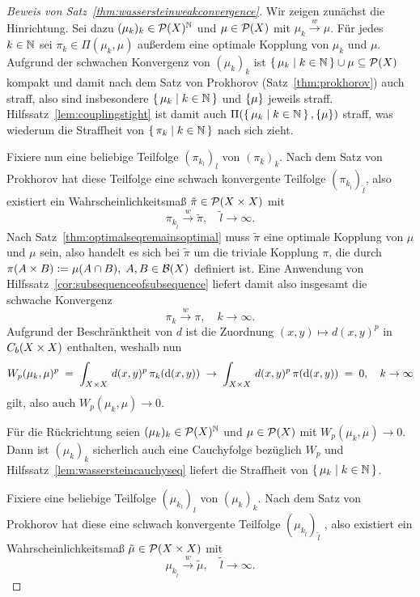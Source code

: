 \documentclass[../main/main.tex]{subfiles}
\begin{document}
	\begin{proof}[Beweis von Satz~\ref{thm:wassersteinweakconvergence}]
		Wir zeigen zunächst die Hinrichtung. Sei dazu $(\mu_k)_k \in \mathcal{P}(X)^{\mathbb{N}}$ und $\mu \in \mathcal{P}(X)$ mit $\mu_k \xrightarrow{w} \mu$. Für jedes $k \in \mathbb{N}$ sei $\pi_k \in \Pi(\mu_k, \mu)$ außerdem
		eine optimale Kopplung von $\mu_k$ und $\mu$. Aufgrund der schwachen Konvergenz von $(\mu_k)_k$ ist $\left\{\, \mu_k \; \middle| \; k \in \mathbb{N} \,\right\} \cup {\mu} \subseteq \mathcal{P}(X)$ kompakt und damit nach dem 
		Satz von Prokhorov (Satz~\ref{thm:prokhorov}) auch straff, also sind insbesondere $\left\{\, \mu_k \; \middle| \; k \in \mathbb{N} \,\right\}$ und $\left\{\mu\right\}$ jeweils straff. 
		Hilfssatz~\ref{lem:couplingstight} ist damit auch $\Pi(\left\{\, \mu_k \; \middle| \; k \in \mathbb{N} \,\right\}, \left\{\mu\right\})$ straff, was wiederum die Straffheit von $\left\{\, \pi_k \; \middle| \; k \in \mathbb{N} \,\right\}$ nach sich zieht. 
		
		Fixiere nun eine beliebige Teilfolge $(\pi_{k_l})_l$ von $(\pi_k)_k$. Nach dem Satz von Prokhorov hat diese Teilfolge eine schwach konvergente Teilfolge $(\pi_{k_{\tilde{l}}})_{\tilde{l}}$, also existiert ein Wahrscheinlichkeitsmaß $\tilde{\pi} \in \mathcal{P}(X \times X)$ mit
		\[ \pi_{k_{\tilde{l}}} \xrightarrow{w} \tilde{\pi}, \quad \tilde{l} \to \infty \text{.} \]
		Nach Satz~\ref{thm:optimalseqremainsoptimal} muss $\tilde{\pi}$ eine optimale Kopplung von $\mu$ und $\mu$ sein, also handelt es sich bei $\tilde{\pi}$ um die triviale Kopplung $\pi$, die durch
		$\pi(A \times B) \vcentcolon = \mu(A \cap B), \; A, B \in \mathcal{B}(X)$
		definiert ist.
		Eine Anwendung von Hilfssatz~\ref{cor:subsequenceofsubsequence} liefert damit also insgesamt die schwache Konvergenz
		\[ \pi_k \xrightarrow{w} \pi, \quad k \to \infty \text{.} \]
		Aufgrund der Beschränktheit von $d$ ist die Zuordnung $(x, y) \mapsto d(x, y)^p$ in $C_b(X \times X)$ enthalten, weshalb nun
		\[ W_p(\mu_k, \mu)^p \; = \; \int_{X \times X} \, d(x, y)^p \, \pi_k(\mathrm{d}(x, y)) \; \to \; \int_{X \times X} \, d(x, y)^p \, \pi(\mathrm{d}(x, y)) \; = \; 0, \quad k \to \infty \]
		gilt, also auch $W_p(\mu_k, \mu) \to 0$.
		
		Für die Rückrichtung seien $(\mu_k)_k \in \mathcal{P}(X)^{\mathbb{N}}$ und $\mu \in \mathcal{P}(X)$ mit $W_p(\mu_k, \mu) \to 0$. Dann ist $(\mu_k)_k$ sicherlich auch eine Cauchyfolge bezüglich $W_p$ 
		und Hilfssatz~\ref{lem:wassersteincauchyseq} liefert die Straffheit von $\left\{\, \mu_k \; \middle| \; k \in \mathbb{N} \,\right\}$. 
		
		Fixiere eine beliebige Teilfolge $(\mu_{k_l})_l$ von $(\mu_k)_k$. Nach dem Satz von Prokhorov hat diese eine schwach konvergente Teilfolge $(\mu_{k_{\tilde{l}}})_{\tilde{l}}$ , also existiert ein Wahrscheinlichkeitsmaß $\tilde{\mu} \in \mathcal{P}(X \times X)$ mit
		\[ \mu_{k_{\tilde{l}}} \xrightarrow{w} \tilde{\mu}, \quad \tilde{l} \to \infty \text{.} \]
	\end{proof}
	
\end{document}
